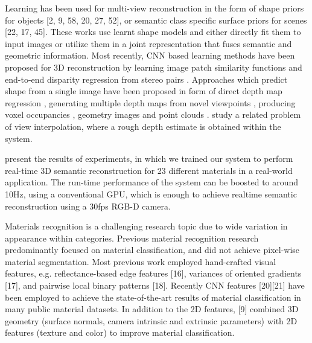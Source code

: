 \documentclass{article}
\begin{document}
Learning has been used for multi-view reconstruction in the form of shape priors for objects [2, 9, 58, 20, 27, 52], or semantic class specific surface priors for scenes [22, 17, 45]. These works use learnt shape models and either directly fit them to input images or utilize them in a joint representation that fuses semantic and geometric information. Most recently, CNN based learning methods have been proposed for 3D reconstruction by learning image patch similarity functions \cite {zbontar2016stereo} \cite {han2015matchnet} \cite {hartmann2017learned} and end-to-end disparity regression from stereo pairs \cite {mayer2016large} \cite {kendall2017end} . Approaches which predict shape from a single image have been proposed in form of direct depth map regression \cite {saxena2007depth} \cite {ladicky2014pulling} \cite {eigen2014depth}, generating multiple depth maps from novel viewpoints \cite {tatarchenko2016multi}, producing voxel occupancies \cite {choy20163d} \cite {girdhar2016learning}, geometry images \cite {sinha2016deep} and point clouds \cite {fan2017point}. \cite {flynn2016deepstereo} study a related problem of view interpolation, where a rough depth estimate is obtained within the system.\par

\cite {zhao2017fully} present the results of experiments, in which we trained our system to perform real-time 3D semantic reconstruction for 23 different materials in a real-world application. The run-time performance of the system can be boosted to around 10Hz, using a conventional GPU, which is enough to achieve realtime semantic reconstruction using a 30fps RGB-D camera.

Materials recognition is a challenging research topic due to wide variation in appearance within categories. Previous material recognition research predominantly focused on material classification, and did not achieve pixel-wise material segmentation. Most previous work employed hand-crafted visual features, e.g. reflectance-based edge features [16], variances of
oriented gradients [17], and pairwise local binary patterns [18]. Recently CNN features \cite { schwartz2013visual} [20][21] have been employed to achieve the state-of-the-art results of material classification in many public material datasets. In addition to the 2D features, [9] combined 3D geometry (surface normals, camera intrinsic and extrinsic parameters) with 2D features (texture and color) to improve material classification.




% 

\end{document}
